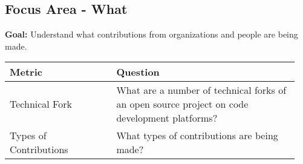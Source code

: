 


\subsection{Focus Area - What}
\textbf{Goal:} Understand what contributions from organizations and people are being made.
\begin{table}[ht!]
	\centering
	\begin{tabular}{|p{0.35\linewidth} | p{0.6\linewidth}|}
			\hline
			\hfil \textbf{Metric}  & \hfil \textbf{Question} \\ 
			\hline		
			Technical Fork & What are a number of technical forks of an open source project on code development platforms? \\
			\hline
			Types of Contributions & What types of contributions are being made? \\
			\hline
	\end{tabular}
\end{table}

